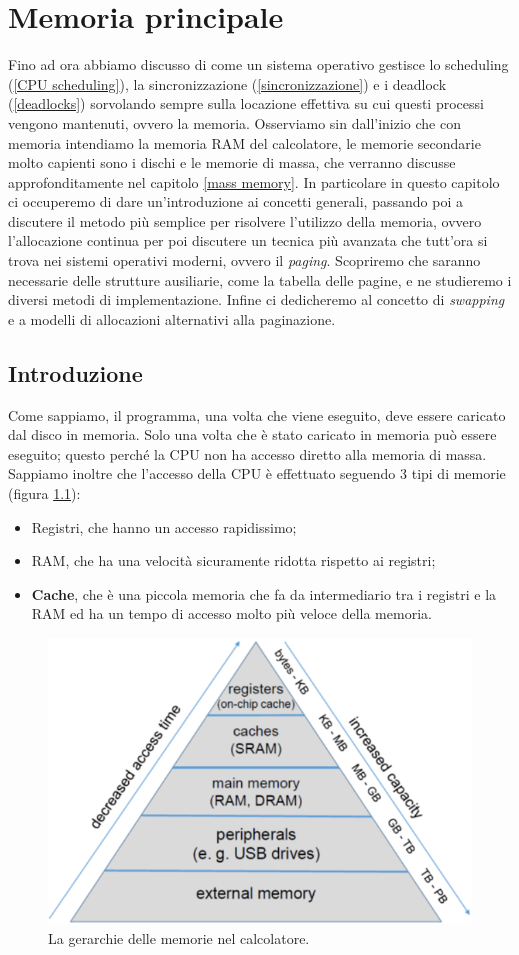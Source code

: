 \chapter{Memoria principale}\label{main memory}
Fino ad ora abbiamo discusso di come un sistema operativo gestisce lo scheduling (\ref{CPU scheduling}), la sincronizzazione (\ref{sincronizzazione}) e i deadlock (\ref{deadlocks}) sorvolando sempre sulla locazione effettiva su cui questi processi vengono mantenuti, ovvero la memoria. Osserviamo sin dall'inizio che con memoria intendiamo la memoria RAM del calcolatore, le memorie secondarie molto capienti sono i dischi e le memorie di massa, che verranno discusse approfonditamente nel capitolo \ref{mass memory}. In particolare in questo capitolo ci occuperemo di dare un'introduzione ai concetti generali, passando poi a discutere il metodo più semplice per risolvere l'utilizzo della memoria, ovvero l'allocazione continua per poi discutere un tecnica più avanzata che tutt'ora si trova nei sistemi operativi moderni, ovvero il \textit{paging}. Scopriremo che saranno necessarie delle strutture ausiliarie, come la tabella delle pagine, e ne studieremo i diversi metodi di implementazione. Infine ci dedicheremo al concetto di \textit{swapping} e a modelli di allocazioni alternativi alla paginazione.

\section{Introduzione}
Come sappiamo, il programma, una volta che viene eseguito, deve essere caricato dal disco in memoria. Solo una volta che è stato caricato in memoria può essere eseguito; questo perché la CPU non ha accesso diretto alla memoria di massa. Sappiamo inoltre che l'accesso della CPU è effettuato seguendo 3 tipi di memorie (figura \ref{fig:memory_hierarchy}):
\vspace{-5px}
\begin{itemize}
\setlength{\itemsep}{-.15 em}
    \item Registri, che hanno un accesso rapidissimo;
    \item RAM, che ha una velocità sicuramente ridotta rispetto ai registri;
    \item \textbf{Cache}, che è una piccola memoria che fa da intermediario tra i registri e la RAM ed ha un tempo di accesso molto più veloce della memoria.
\end{itemize}
\begin{figure}[h]
    \centering
    \includegraphics[width = .5\textwidth]{../res/imgs/main memory/memory_hierarchy.png}
    \caption{La gerarchie delle memorie nel calcolatore.}
    \label{fig:memory_hierarchy}
\end{figure}

